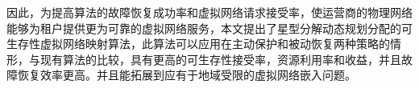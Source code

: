 因此，为提高算法的故障恢复成功率和虚拟网络请求接受率，使运营商的物理网络能够为租户提供更为可靠的虚拟网络服务，本文提出了星型分解动态规划分配的可生存性虚拟网络映射算法，此算法可以应用在主动保护和被动恢复两种策略的情形，与现有算法的比较，具有更高的可生存性接受率，资源利用率和收益，并且故障恢复效率更高。并且能拓展到应有于地域受限的虚拟网络嵌入问题。




